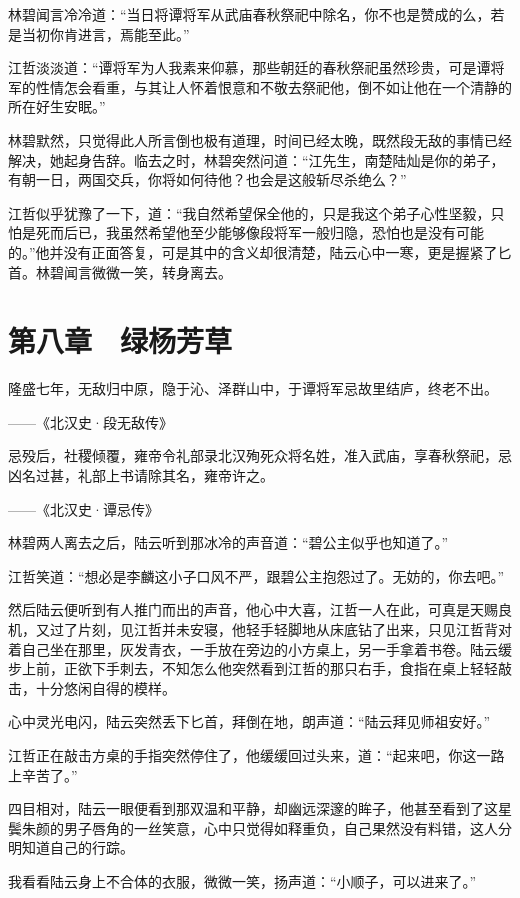 林碧闻言冷冷道：“当日将谭将军从武庙春秋祭祀中除名，你不也是赞成的么，若是当初你肯进言，焉能至此。”

江哲淡淡道：“谭将军为人我素来仰慕，那些朝廷的春秋祭祀虽然珍贵，可是谭将军的性情怎会看重，与其让人怀着恨意和不敬去祭祀他，倒不如让他在一个清静的所在好生安眠。”

林碧默然，只觉得此人所言倒也极有道理，时间已经太晚，既然段无敌的事情已经解决，她起身告辞。临去之时，林碧突然问道：“江先生，南楚陆灿是你的弟子，有朝一日，两国交兵，你将如何待他？也会是这般斩尽杀绝么？”

江哲似乎犹豫了一下，道：“我自然希望保全他的，只是我这个弟子心性坚毅，只怕是死而后已，我虽然希望他至少能够像段将军一般归隐，恐怕也是没有可能的。”他并没有正面答复，可是其中的含义却很清楚，陆云心中一寒，更是握紧了匕首。林碧闻言微微一笑，转身离去。

\chapter{第八章　绿杨芳草}

隆盛七年，无敌归中原，隐于沁、泽群山中，于谭将军忌故里结庐，终老不出。

——《北汉史·段无敌传》

忌殁后，社稷倾覆，雍帝令礼部录北汉殉死众将名姓，准入武庙，享春秋祭祀，忌凶名过甚，礼部上书请除其名，雍帝许之。

——《北汉史·谭忌传》

林碧两人离去之后，陆云听到那冰冷的声音道：“碧公主似乎也知道了。”

江哲笑道：“想必是李麟这小子口风不严，跟碧公主抱怨过了。无妨的，你去吧。”

然后陆云便听到有人推门而出的声音，他心中大喜，江哲一人在此，可真是天赐良机，又过了片刻，见江哲并未安寝，他轻手轻脚地从床底钻了出来，只见江哲背对着自己坐在那里，灰发青衣，一手放在旁边的小方桌上，另一手拿着书卷。陆云缓步上前，正欲下手刺去，不知怎么他突然看到江哲的那只右手，食指在桌上轻轻敲击，十分悠闲自得的模样。

心中灵光电闪，陆云突然丢下匕首，拜倒在地，朗声道：“陆云拜见师祖安好。”

江哲正在敲击方桌的手指突然停住了，他缓缓回过头来，道：“起来吧，你这一路上辛苦了。”

四目相对，陆云一眼便看到那双温和平静，却幽远深邃的眸子，他甚至看到了这星鬓朱颜的男子唇角的一丝笑意，心中只觉得如释重负，自己果然没有料错，这人分明知道自己的行踪。

我看看陆云身上不合体的衣服，微微一笑，扬声道：“小顺子，可以进来了。”

